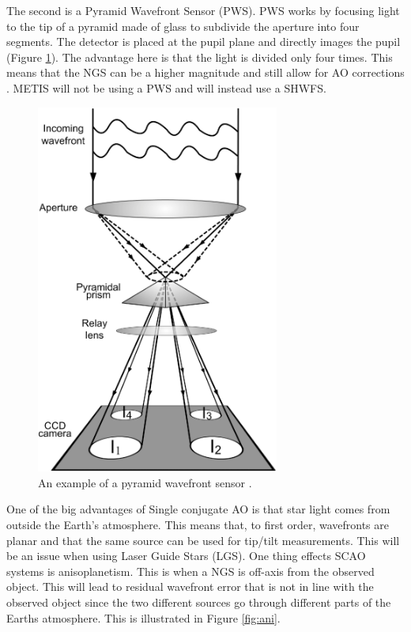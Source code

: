 The second is a Pyramid Wavefront Sensor (PWS).  PWS works by focusing light to the
tip of a pyramid made of glass to subdivide the aperture into four segments.  The
detector is placed at the pupil plane and directly images the pupil (Figure
\ref{fig:pyramid}).  The advantage here is that the light is divided only 
four times.  This means that the NGS can be a higher magnitude and still allow for
AO corrections \cite{Shatokhina:13}.  METIS will not be using a PWS and will instead
use a SHWFS.

\begin{figure}[h!]
\centering
\includegraphics[width=8cm]{Figures/pyramid.jpeg}
\caption{An example of a pyramid wavefront sensor \cite{Shatokhina:13}.}
\label{fig:pyramid}
\end{figure}


One of the big advantages of Single conjugate AO is that star light comes from
outside the Earth's atmosphere.  This means that, to first order, wavefronts are
planar and that the same source can be used for tip/tilt measurements.  This will be
an issue when using Laser Guide Stars (LGS).  One thing effects SCAO systems is
anisoplanetism.  This is when a NGS is off-axis from the observed object.  This will
lead to residual wavefront error that is not in line with the observed object since
the two different sources go through different parts of the Earths atmosphere.  This
is illustrated in Figure \ref{fig:ani}.

